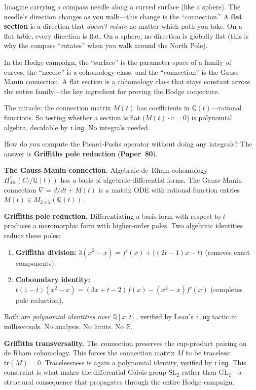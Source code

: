 \documentclass[11pt,twoside,openany]{report}
\theoremstyle{remark}
\newcommand{\paperref}[1]{\textbf{Paper~#1}}
\begin{document}
\begin{analogybox}
Imagine carrying a compass needle along a curved surface (like a sphere). The needle's direction changes as you walk---this change is the ``connection.'' A \textbf{flat section} is a direction that \emph{doesn't rotate} no matter which path you take. On a flat table, every direction is flat. On a sphere, no direction is globally flat (this is why the compass ``rotates'' when you walk around the North Pole).

In the Hodge campaign, the ``surface'' is the parameter space of a family of curves, the ``needle'' is a cohomology class, and the ``connection'' is the Gauss-Manin connection. A flat section is a cohomology class that stays constant across the entire family---the key ingredient for proving the Hodge conjecture.

The miracle: the connection matrix $M(t)$ has coefficients in $\mathbb{Q}(t)$---rational functions. So testing whether a section is flat ($M(t) \cdot v = 0$) is polynomial algebra, decidable by \texttt{ring}. No integrals needed.
\end{analogybox}

How do you compute the Picard-Fuchs operator without doing any integrals? The answer is \textbf{Griffiths pole reduction} (\paperref{80}).

\textbf{The Gauss-Manin connection.} Algebraic de~Rham cohomology $H^1_{\mathrm{dR}}(C_t/\mathbb{Q}(t))$ has a basis of algebraic differential forms. The Gauss-Manin connection $\nabla = d/dt + M(t)$ is a matrix ODE with rational function entries $M(t) \in M_{2\times 2}(\mathbb{Q}(t))$.

\textbf{Griffiths pole reduction.} Differentiating a basis form with respect to $t$ produces a meromorphic form with higher-order poles. Two algebraic identities reduce these poles:
\begin{enumerate}
  \item \textbf{Griffiths division:} $3(x^2 - x) = f'(x) + \bigl((2t-1)x - t\bigr)$ (removes exact components).
  \item \textbf{Coboundary identity:} $t(1-t)(x^2-x) = (3x+t-2)f(x) - (x^2-x)f'(x)$ (completes pole reduction).
\end{enumerate}
Both are \emph{polynomial identities over $\mathbb{Q}[x,t]$}, verified by Lean's \texttt{ring} tactic in milliseconds. No analysis. No limits. No $\mathbb{R}$.

\textbf{Griffiths transversality.} The connection preserves the cup-product pairing on de Rham cohomology. This forces the connection matrix $M$ to be traceless: $\mathrm{tr}(M) = 0$. Tracelessness is again a polynomial identity, verified by \texttt{ring}. This constraint is what makes the differential Galois group $\mathrm{SL}_2$ rather than $\mathrm{GL}_2$---a structural consequence that propagates through the entire Hodge campaign.
\end{document}
